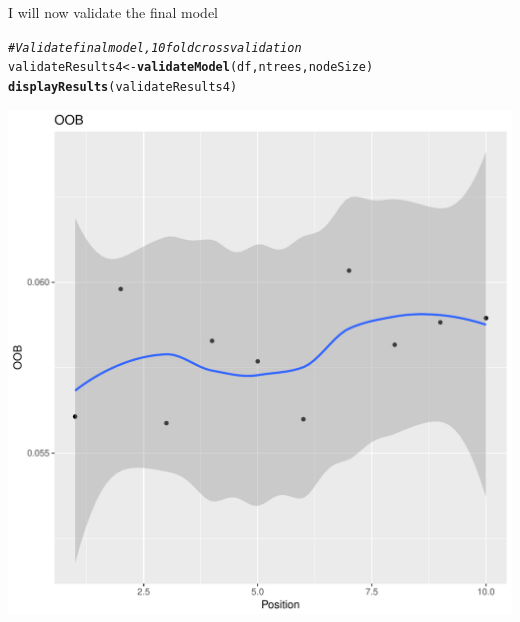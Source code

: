 \documentclass{article}\usepackage[]{graphicx}\usepackage[]{color}
\makeatletter
\def\maxwidth{ %
  \ifdim\Gin@nat@width>\linewidth
    \linewidth
  \else
    \Gin@nat@width
  \fi
}
\newcommand{\hlcom}[1]{\textcolor[rgb]{0.678,0.584,0.686}{\textit{#1}}}%
\newcommand{\hlstd}[1]{\textcolor[rgb]{0.345,0.345,0.345}{#1}}%
\newcommand{\hlkwb}[1]{\textcolor[rgb]{0.69,0.353,0.396}{#1}}%
\newcommand{\hlkwd}[1]{\textcolor[rgb]{0.737,0.353,0.396}{\textbf{#1}}}%
\newenvironment{kframe}{%
 \def\at@end@of@kframe{}%
 \ifinner\ifhmode%
  \def\at@end@of@kframe{\end{minipage}}%
  \begin{minipage}{\columnwidth}%
 \fi\fi%
 \def\FrameCommand##1{\hskip\@totalleftmargin \hskip-\fboxsep
 \colorbox{shadecolor}{##1}\hskip-\fboxsep
     \hskip-\linewidth \hskip-\@totalleftmargin \hskip\columnwidth}%
 \MakeFramed {\advance\hsize-\width
   \@totalleftmargin\z@ \linewidth\hsize
   \@setminipage}}%
 {\par\unskip\endMakeFramed%
 \at@end@of@kframe}
\newenvironment{knitrout}{}{} %
\makeatother
\begin{document}
I will now validate the final model
\begin{knitrout}
\color{fgcolor}\begin{kframe}
\begin{alltt}
\hlcom{#Validate final model, 10 fold cross validation }
\hlstd{validateResults4}\hlkwb{<-}\hlkwd{validateModel}\hlstd{(df,ntrees,nodeSize)}
\hlkwd{displayResults}\hlstd{(validateResults4)}
\end{alltt}


{\ttfamily\noindent\itshape\color{messagecolor}{\#\# `geom\_smooth()` using method = 'loess'}}\end{kframe}
\includegraphics[width=\maxwidth]{figure/unnamed-chunk-43-1} 
\begin{kframe}


\end{kframe}
\end{knitrout}
\end{document}
